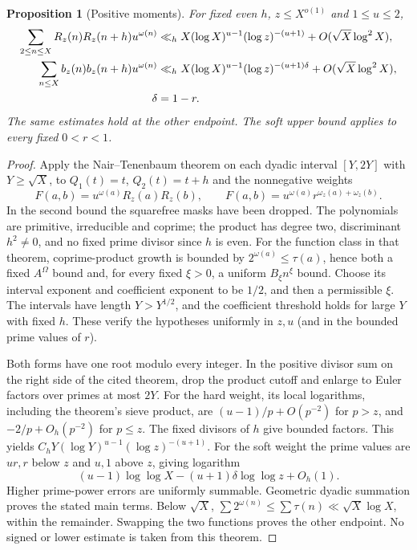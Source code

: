 \documentclass[11pt]{article}
\newtheorem{proposition}[theorem]{Proposition}
\theoremstyle{definition}
\theoremstyle{remark}
\numberwithin{equation}{section}
\begin{document}
\begin{proposition}[Positive moments]\label{prop:positive-moment}
For fixed even $h$, $z\le X^{o(1)}$ and $1\le u\le2$,
\begin{align}
 \sum_{2\le n\le X}R_z(n)R_z(n+h)u^{\omega(n)}
 &\ll_h X(\log X)^{u-1}(\log z)^{-(u+1)}+O(\sqrt X\log^2X),\label{eq:hard-positive-moment}\\
 \sum_{n\le X}b_z(n)b_z(n+h)u^{\omega(n)}
 &\ll_h X(\log X)^{u-1}(\log z)^{-(u+1)\delta}+O(\sqrt X\log^2X),\label{eq:soft-positive-moment}\\
 \qquad \delta&=1-r.\notag
\end{align}
The same estimates hold at the other endpoint. The soft upper bound applies to every fixed $0<r<1$.
\end{proposition}
\begin{proof}
Apply the Nair--Tenenbaum theorem \cite[Theorem~1, pp.~1--2]{Henriot} on each dyadic interval $[Y,2Y]$ with
$Y\ge\sqrt X$, to $Q_1(t)=t$, $Q_2(t)=t+h$ and the nonnegative weights
\begin{equation}\label{eq:nt-functions}
 F(a,b)=u^{\omega(a)}R_z(a)R_z(b),\qquad
 F(a,b)=u^{\omega(a)}r^{\omega_z(a)+\omega_z(b)}.
\end{equation}
In the second bound the squarefree masks have been dropped.
The polynomials are primitive, irreducible and coprime; the product has degree two, discriminant $h^2\ne0$,
and no fixed prime divisor since $h$ is even.
For the function class in that theorem, coprime-product growth is bounded by $2^{\omega(a)}\le\tau(a)$, hence
both a fixed $A^{\Omega}$ bound and, for every fixed $\xi>0$, a uniform $B_\xi n^\xi$ bound.
Choose its interval exponent and coefficient exponent to be $1/2$, and then a permissible $\xi$.
The intervals have length $Y>Y^{1/2}$, and the coefficient threshold holds for large $Y$ with fixed $h$.
These verify the hypotheses uniformly in $z,u$ (and in the bounded prime values of $r$).

Both forms have one root modulo every integer. In the positive divisor sum on the right side of the cited
theorem, drop the product cutoff and enlarge to Euler factors over primes at most $2Y$.
For the hard weight, its local logarithms, including the theorem's sieve product, are
$(u-1)/p+O(p^{-2})$ for $p>z$, and $-2/p+O_h(p^{-2})$ for $p\le z$.
The fixed divisors of $h$ give bounded factors. This yields
$C_hY(\log Y)^{u-1}(\log z)^{-(u+1)}$.
For the soft weight the prime values are $ur,r$ below $z$ and $u,1$ above $z$, giving logarithm
\begin{equation}\label{eq:soft-moment-log}
 (u-1)\log\log X-(u+1)\delta\log\log z+O_h(1).
\end{equation}
Higher prime-power errors are uniformly summable. Geometric dyadic summation proves the stated main terms.
Below $\sqrt X$, $\sum2^{\omega(n)}\le\sum\tau(n)\ll\sqrt X\log X$, within the remainder.
Swapping the two functions proves the other endpoint. No signed or lower estimate is taken from this theorem.
\end{proof}
\end{document}
